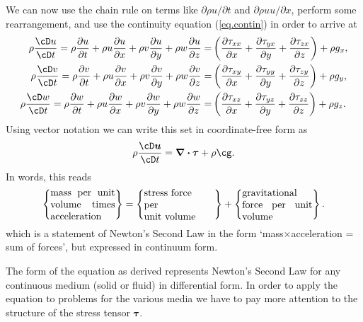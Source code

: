 \documentclass[twoside,11pt]		{report}
\begin{document}
We can now use the chain rule on terms like $\partial \rho u/\partial
t$ and $\partial \rho u u/\partial x$, perform some rearrangement, and
use the continuity equation (\ref{eq.contin}) in order to arrive at
\begin{align}
\rho\frac{\cD u}{\cD t}=\rho\frac{\partial u}{\partial t} + 
\rho u\frac{\partial u}{\partial x} +
\rho v\frac{\partial u}{\partial y} +
\rho w\frac{\partial u}{\partial z} =&
\left(
\frac{\partial \tau_{xx}}{\partial x} +
\frac{\partial \tau_{yx}}{\partial y} +
\frac{\partial \tau_{zx}}{\partial z}
\right)
+\rho g_x,\\
\rho\frac{\cD v}{\cD t}=\rho\frac{\partial v}{\partial t} + 
\rho u\frac{\partial v}{\partial x} +
\rho v\frac{\partial v}{\partial y} +
\rho w\frac{\partial v}{\partial z} =&
\left(
\frac{\partial \tau_{xy}}{\partial x} +
\frac{\partial \tau_{yy}}{\partial y} +
\frac{\partial \tau_{zy}}{\partial z}
\right)
+\rho g_y,\\
\rho\frac{\cD w}{\cD t}=\rho\frac{\partial w}{\partial t} + 
\rho u\frac{\partial w}{\partial x} +
\rho v\frac{\partial w}{\partial y} +
\rho w\frac{\partial w}{\partial z} =&
\left(
\frac{\partial \tau_{xz}}{\partial x} +
\frac{\partial \tau_{yz}}{\partial y} +
\frac{\partial \tau_{zz}}{\partial z}
\right)
+\rho g_z.
\end{align}
Using vector notation we can write this set in coordinate-free form as
\begin{equation}
\rho\frac{\cD\bm{u}}{\cD t}=
\bm{\nabla\cdot\tau} + \rho\bm{\cg}.
\label{eq.momvec}
\end{equation}
In words, this reads
\begin{equation}
\left\{ \parbox{23mm}{mass per unit volume times acceleration} \right\}=
\left\{ \parbox{25mm}{stress force \\
                      per\\ unit volume} \right\} +
\left\{ \parbox{25mm}{gravitational force per unit volume} \right\}.
\label{eq.newt2_words}
\end{equation}
which is a statement of Newton's Second Law in the form
`mass$\times$acceleration = sum of forces', but expressed in continuum
form.

The form of the equation as derived represents Newton's Second Law for
any continuous medium (solid or fluid) in differential form. In order
to apply the equation to problems for the various media we have to pay
more attention to the structure of the stress tensor $\bm{\tau}$.


\end{document}
